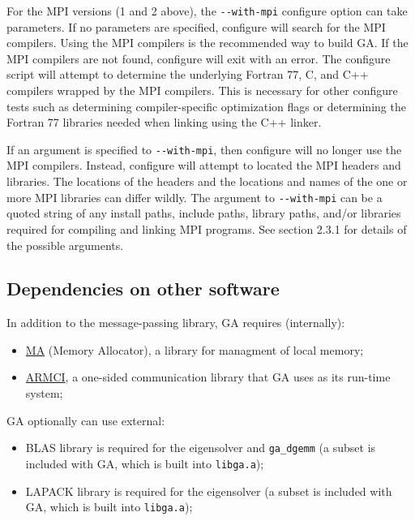 For the MPI versions (1 and 2 above), the \texttt{-{}-with-mpi} configure
option can take parameters. If no parameters are specified, configure will
search for the MPI compilers. Using the MPI compilers is the recommended way to
build GA. If the MPI compilers are not found, configure will exit with an
error. The configure script will attempt to determine the underlying Fortran
77, C, and C++ compilers wrapped by the MPI compilers. This is necessary for
other configure tests such as determining compiler-specific optimization flags
or determining the Fortran 77 libraries needed when linking using the C++
linker.

If an argument is specified to \texttt{-{}-with-mpi}, then configure will no
longer use the MPI compilers. Instead, configure will attempt to located the
MPI headers and libraries. The locations of the headers and the locations and
names of the one or more MPI libraries can differ wildly. The argument to
\texttt{-{}-with-mpi} can be a quoted string of any install paths, include
paths, library paths, and/or libraries required for compiling and linking MPI
programs. See section 2.3.1 for details of the possible arguments. 

\subsection{Dependencies on other software}

In addition to the message-passing library, GA requires (internally):

\begin{itemize}

\item \href{http://www.emsl.pnl.gov/docs/parsoft/ma/MAapi.html}{MA} (Memory
Allocator), a library for managment of local memory; 

\item \href{http://www.emsl.pnl.gov/docs/parsoft/armci}{ARMCI}, a one-sided
communication library that GA uses as its run-time system; 

\end{itemize}

GA optionally can use external: 

\begin{itemize}

\item BLAS library is required for the eigensolver and \texttt{ga\_dgemm}
(a subset is included with GA, which is built into \texttt{libga.a});

\item LAPACK library is required for the eigensolver (a subset is included
with GA, which is built into \texttt{libga.a}); 

\end{itemize}

